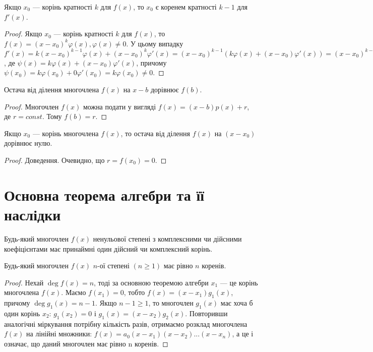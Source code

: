 \begin{claim}
	Якщо $x_0$ --- корінь кратності $k$ для $f(x)$, то $x_0$ є коренем кратності $k-1$
	для $f'(x)$.
\end{claim}
\begin{proof}
	Якщо $x_0$ --- корінь кратності $k$ для $f(x)$, то $f(x) = (x-x_0)^k\varphi(x), \varphi(x) \neq 0$.
	У цьому випадку $f'(x) = k(x-x_0)^{k-1}\varphi(x) + (x-x_0)^k\varphi'(x) = (x-x_0)^{k-1}(k\varphi(x)
	+ (x-x_0)\varphi'(x)) = (x-x_0)^{k-1}\psi(x)$, де $\psi(x) = k\varphi(x) + (x-x_0)\varphi'(x)$,
	причому $\psi(x_0) = k\varphi(x_0) + 0 \varphi'(x_0) = k\varphi(x_0) \neq 0$.
\end{proof}

\begin{theorem}
	Остача від ділення многочлена $f(x)$ на $x-b$ дорівнює $f(b)$.
\end{theorem}
\begin{proof}
	Многочлен $f(x)$ можна подати у вигляді $f(x) =  (x-b)p(x) + r$,
	де $r = const$. Тому $f(b) = r$.
\end{proof}

\begin{corollary}
	Якщо $x_0$ --- корінь многочлена $f(x)$, то остача від ділення $f(x)$ на
	$(x - x_0)$ дорівнює нулю.
\end{corollary}
\begin{proof}
	Доведення. Очевидно, що $r = f(x_0) = 0$. 
\end{proof}

\section{Основна теорема алгебри та її наслідки}

\begin{theorem}
	Будь-який многочлен $f(x)$ ненульової степені з комплексними чи
	дійсними коефіцієнтами має принаймні один дійсний чи комплексний корінь.
\end{theorem}

\begin{corollary}
	Будь-який многочлен $f(x)$ $n$-ої степені $(n \geqslant 1)$ має рівно $n$ коренів.
\end{corollary}
\begin{proof}
	Нехай $\deg f(x) = n$, тоді за основною теоремою алгебри $x_1$ --- це
	корінь многочлена $f(x)$. Маємо $f(x_1) = 0$, тобто $f(x) = (x - x_1)g_1(x)$, причому
	$\deg g_1(x) = n-1$. Якщо $n - 1 \geqslant 1$, то многочлен $g_1(x)$ має хоча б один корінь $x_2$:
	$g_1(x_2) = 0$ і $g_1(x) = (x - x_2)g_2(x)$. Повторивши аналогічні міркування потрібну
	кількість разів, отримаємо розклад многочлена $f(x)$ на лінійні множники:
	$f(x) = a_0(x-x_1)(x-x_2)...(x-x_n)$,
	а це і означає, що даний многочлен має рівно n коренів.
\end{proof}

